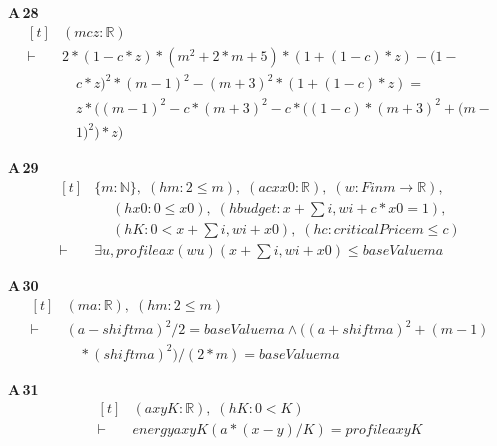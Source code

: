 \noindent\textbf{A\,28}\quad{}
{\footnotesize\[ \begin{aligned}[t]
&(\mathit{m} \mathit{c} \mathit{z} : \mathbb{R} )\\
\vdash\;&2*(1-\mathit{c}*\mathit{z})*(\mathit{m}^{2}+2*\mathit{m}+5)*(1+(1-\mathit{c})*\mathit{z}) - (1-\\
&\quad \mathit{c}*\mathit{z})^{2}*(\mathit{m}-1)^{2} - (\mathit{m}+3)^{2}*(1+(1-\mathit{c})*\mathit{z}) =\\
&\quad \mathit{z}*((\mathit{m}-1)^{2} - \mathit{c}*(\mathit{m}+3)^{2} - \mathit{c}*((1-\mathit{c})*(\mathit{m}+3)^{2}+(\mathit{m}-\\
&\quad 1)^{2})*\mathit{z})
\end{aligned} \]}

\noindent\textbf{A\,29}\quad{}
{\footnotesize\[ \begin{aligned}[t]
&\{ \mathit{m} : \mathbb{N} \},\; (\mathit{hm} : 2 \leq \mathit{m}),\; (\mathit{a} \mathit{c} \mathit{x} \mathit{x0} : \mathbb{R} ),\; (\mathit{w} : \mathit{Fin} \mathit{m} \to \mathbb{R} ),\\
&\quad \; (\mathit{hx0} : 0 \leq \mathit{x0}),\; (\mathit{hbudget} : \mathit{x} + \textstyle\sum \mathit{i}, \mathit{w} \mathit{i} + \mathit{c}*\mathit{x0} = 1),\\
&\quad \; (\mathit{hK} : 0 < \mathit{x} + \textstyle\sum \mathit{i}, \mathit{w} \mathit{i} + \mathit{x0}),\; (\mathit{hc} : \mathit{criticalPrice} \mathit{m} \leq \mathit{c})\\
\vdash\;&\exists \mathit{u}, \mathit{profile} \mathit{a} \mathit{x} (\mathit{w} \mathit{u}) (\mathit{x} + \textstyle\sum \mathit{i}, \mathit{w} \mathit{i} + \mathit{x0}) \leq \mathit{baseValue} \mathit{m} \mathit{a}
\end{aligned} \]}

\noindent\textbf{A\,30}\quad{}
{\footnotesize\[ \begin{aligned}[t]
&(\mathit{m} \mathit{a} : \mathbb{R} ),\; (\mathit{hm} : 2 \leq \mathit{m})\\
\vdash\;&(\mathit{a}-\mathit{shift} \mathit{m} \mathit{a})^{2}/2 = \mathit{baseValue} \mathit{m} \mathit{a} \wedge ((\mathit{a}+\mathit{shift} \mathit{m} \mathit{a})^{2}+(\mathit{m}-1)\\
&\quad *(\mathit{shift} \mathit{m} \mathit{a})^{2})/(2*\mathit{m}) = \mathit{baseValue} \mathit{m} \mathit{a}
\end{aligned} \]}

\noindent\textbf{A\,31}\quad{}
{\footnotesize\[ \begin{aligned}[t]
&(\mathit{a} \mathit{x} \mathit{y} \mathit{K} : \mathbb{R} ),\; (\mathit{hK} : 0 < \mathit{K})\\
\vdash\;&\mathit{energy} \mathit{a} \mathit{x} \mathit{y} \mathit{K} (\mathit{a}*(\mathit{x}-\mathit{y})/\mathit{K}) = \mathit{profile} \mathit{a} \mathit{x} \mathit{y} \mathit{K}
\end{aligned} \]}

